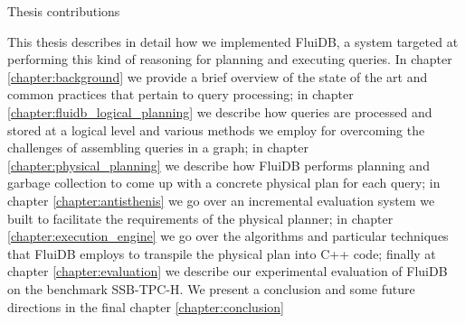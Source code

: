 \begin{corrected}{Thesis contributions}
  \begin{comment}
\begin{itemize}
\item We provide an overview of the literature regarding intermediate
  result recycling.
\item We describe a framework and a case study for a novel approach of
  unifying query planning and intermediate result management.
\item We introduce reversible relational operators and how they can be
  used to create effective plans in memory constrained environments,
  effectively unifying the query planning and intermediate result
  recycling mechanisms.
\item We introduce a novel variant of a branch and bound algorithm
  used for planning relational queries.
\item We introduce Antisthenis, a novel approach to incremental
  computation used for the needs of query planning that aggressively
  takes advantage of the particular properties of the computations
  involved in plan cost estimation and relation materialisability.
\item We describe a code generation framework to support the operation
  of FluiDB.
\item We provide experimental evaluation of how all these parts fit
  together to compose FluiDB, particularly in the context of a star
  schema based benchmark.
\end{itemize}
\end{comment}
\end{corrected}

This thesis describes in detail how we implemented FluiDB, a system
targeted at performing this kind of reasoning for planning and
executing queries. In chapter \ref{chapter:background} we provide a
brief overview of the state of the art and common practices that
pertain to query processing; in chapter
\ref{chapter:fluidb_logical_planning} we describe how queries are
processed and stored at a logical level and various methods we employ for
overcoming the challenges of assembling queries in a graph; in chapter
\ref{chapter:physical_planning} we describe how FluiDB performs
planning and garbage collection to come up with a concrete physical
plan for each query; in chapter \ref{chapter:antisthenis} we go over
an incremental evaluation system we built to facilitate the
requirements of the physical planner; in chapter
\ref{chapter:execution_engine} we go over the algorithms and
particular techniques that FluiDB employs to transpile the physical
plan into C++ code; finally at chapter \ref{chapter:evaluation} we
describe our experimental evaluation of FluiDB on the benchmark
SSB-TPC-H. We present a conclusion and some future directions in the
final chapter \ref{chapter:conclusion}

